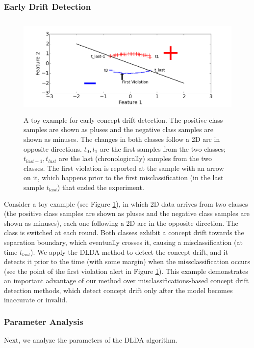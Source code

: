 \documentclass{vldb}
\begin{document}
\subsubsection{Early Drift Detection}\label{sec:earlydetection}
\begin{figure}[ht]
	\centering
	\includegraphics[width=120mm, height=5cm]{EarlyDetection.png}
	\caption{A toy example for early concept drift detection. The positive class samples are shown as pluses and the negative class samples are shown as minuses. The changes in both classes follow a 2D arc in opposite directions. $t_0, t_1$ are the first samples from the two classes; $t_{last-1}, t_{last}$ are the last (chronologically) samples from the two classes. The first violation is reported at the sample with an arrow on it, which happens prior to the first misclassification (in the  last sample $t_{last}$) that ended the experiment.}
	\label{EarlyDetection}
\end{figure}
Consider a toy example (see Figure \ref{EarlyDetection}), in which 2D data arrives from two classes (the positive class samples are shown as pluses and the negative class samples are shown as minuses), each one following a 2D arc in the opposite direction. The class is switched at each round. Both classes exhibit a concept drift towards the separation boundary, which eventually crosses it, causing a misclassification (at time $t_{last}$). We apply the DLDA method to detect the concept drift, and it detects it prior to the time (with some margin) when the missclassification occurs (see the point of the first violation alert in Figure \ref{EarlyDetection}). This example demonstrates an important advantage of our method over misclassifications-based concept drift detection methods, which detect concept drift only after the model becomes inaccurate or invalid.

\subsubsection{Parameter Analysis}\label{sec:paramanal}
Next, we analyze the parameters of the DLDA algorithm.
\end{document}
